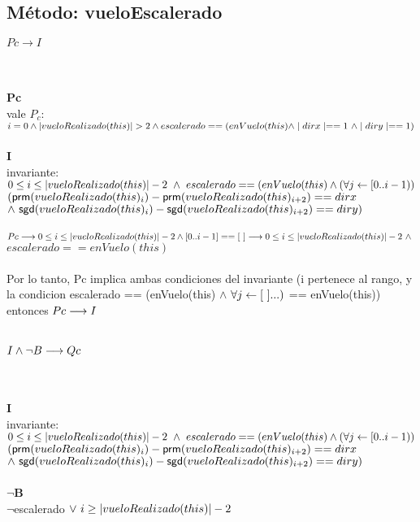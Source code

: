 \documentclass[a4paper]{article}
\begin{document}
    \subsection{M\'etodo: vueloEscalerado}
        \noindent
        \begin{Large}
        {$Pc \rightarrow I$}
        \end{Large}\\
        \\
        \textbf{Pc}\\
        vale $ P_c $: $ i = 0 \land \longitud{vueloRealizado(this)} > 2 \land escalerado == (enVuelo(this) \land \mid dirx \mid == 1 \ \land \mid diry \mid == 1) $ \\
        \\
		\textbf{I}\\
        invariante:$ 0 \leq i \leq \left| vueloRealizado(this) \right| -2 \ \land \ escalerado == (enVuelo(this) \land (\forall j \leftarrow [0..i -1)) $ $ (\mathsf{prm}(vueloRealizado(this)_i) - \mathsf{prm}(vueloRealizado(this)_{i+2}) == dirx $ $ \land \ \mathsf{sgd}(vueloRealizado(this)_i) - \mathsf{sgd}(vueloRealizado(this)_{i+2}) == diry) $ \\   
\\ $Pc \longrightarrow 0 \leq i \leq \left| vueloRealizado(this) \right| -2 \land [0..i-1] == [\ ] \longrightarrow 0 \leq i \leq \left| vueloRealizado(this) \right| -2 \ \land \ $\\$ escalerado == enVuelo(this)$ \\
\\ Por lo tanto, Pc implica ambas condiciones del invariante (i pertenece al rango, y la condicion escalerado == (enVuelo(this) $\land$ $\forall j \leftarrow [\ ]...) $ == enVuelo(this)) \\ entonces $Pc \longrightarrow I$ \\
\\
\begin{Large}
        {$I \land \neg B \longrightarrow Qc$}
        \end{Large}\\
        \\
        \textbf{I}\\
        invariante: $ 0 \leq i \leq \left| vueloRealizado(this) \right| -2 \ \land \ escalerado == (enVuelo(this) \land (\forall j \leftarrow [0..i -1)) $ $ (\mathsf{prm}(vueloRealizado(this)_i) - \mathsf{prm}(vueloRealizado(this)_{i+2}) == dirx $ $ \land \ \mathsf{sgd}(vueloRealizado(this)_i) - \mathsf{sgd}(vueloRealizado(this)_{i+2}) == diry) $ \\
        \\
        \textbf{$\neg$B}\\
        $\neg$escalerado$ \ \vee \ i \geq \left| vueloRealizado(this) \right| - 2$
       
\end{document}
